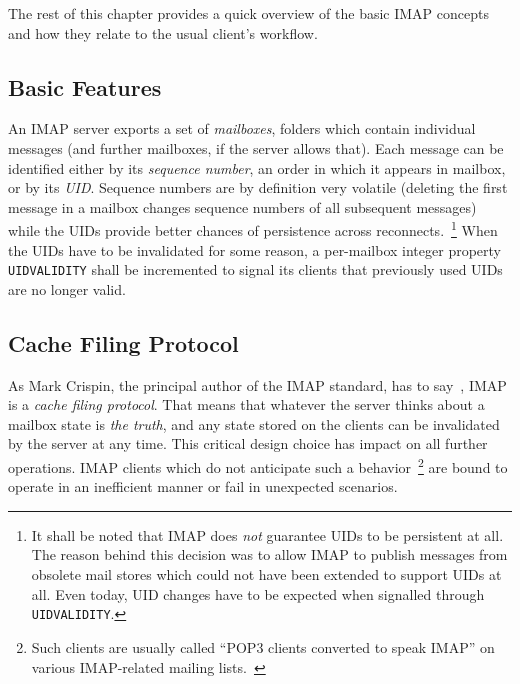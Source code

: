 \documentclass[trojita]{subfiles}
\begin{document}
The rest of this chapter provides a quick overview of the basic IMAP concepts and how they relate to the usual client's
workflow.

\subsection{Basic Features}

An IMAP server exports a set of {\em mailboxes}, folders which contain individual messages (and further mailboxes, if
the server allows that).  Each message can be identified either by its {\em sequence number}, an order in which it
appears in mailbox, or by its {\em UID}.  Sequence numbers are by definition very volatile (deleting the first message
in a mailbox changes sequence numbers of all subsequent messages) while the UIDs provide better chances of persistence
across reconnects.~\footnote{It shall be noted that IMAP does {\em not} guarantee UIDs to be persistent at all.  The
reason behind this decision was to allow IMAP to publish messages from obsolete mail stores which could not have been
extended to support UIDs at all.  Even today, UID changes have to be expected when signalled through {\tt UIDVALIDITY}.}
When the UIDs have to be invalidated for some reason, a per-mailbox integer property {\tt UIDVALIDITY} shall be
incremented to signal its clients that previously used UIDs are no longer valid.

\subsection{Cache Filing Protocol}

As Mark Crispin, the principal author of the IMAP standard, has to say~\cite{crispin-imap-cache-filing}, IMAP is a {\em
cache filing protocol}.  That means that whatever the server thinks about a mailbox state is {\em the truth}, and any
state stored on the clients can be invalidated by the server at any time.  This critical design choice has impact on all
further operations.  IMAP clients which do not anticipate such a behavior~\footnote{Such clients are usually called
``POP3 clients converted to speak IMAP'' on various IMAP-related mailing
lists.~\cite{shannon-imap-clients-glorified-imap}} are bound to operate in an inefficient manner or fail in unexpected
scenarios.
\end{document}
